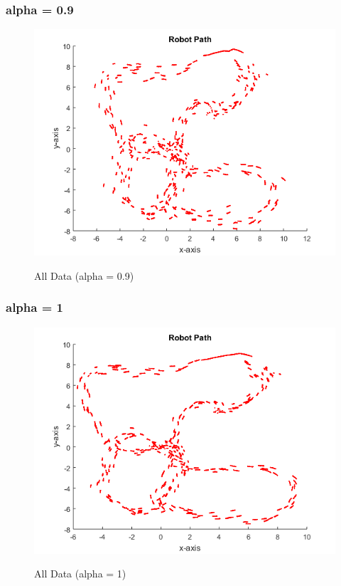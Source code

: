 		\subsubsection{alpha = 0.9}
			\begin{figure}[position = here]
				\begin{centering}
					\includegraphics[scale=1]{./images/q1/all9}\\
					\caption[\textit{A3}]{All Data (alpha = 0.9)\label{RPall9}}
				\end{centering}
			\end{figure}
			\pagebreak
		\subsubsection{alpha = 1}
			\begin{figure}[position = here]
				\begin{centering}
					\includegraphics[scale=1]{./images/q1/dr_newcomppointfive_gpspointfive}\\
					\caption[\textit{A3}]{All Data (alpha = 1)\label{RPallOne}}
				\end{centering}
			\end{figure}
		
